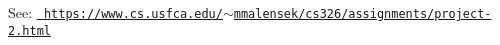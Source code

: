 \label{index_md_README}%
%
 See\+: \href{https://www.cs.usfca.edu/~mmalensek/cs326/assignments/project-2.html}{\texttt{ https\+://www.\+cs.\+usfca.\+edu/$\sim$mmalensek/cs326/assignments/project-\/2.\+html}} 